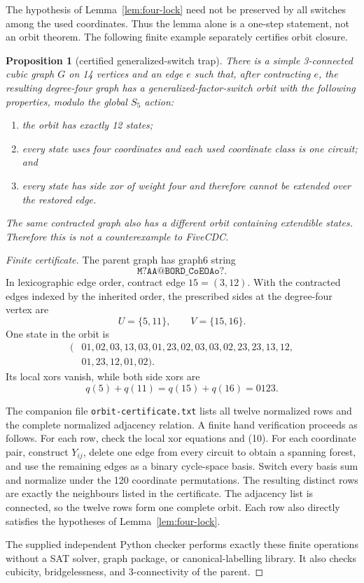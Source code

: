 \documentclass[11pt]{article}
\newtheorem{proposition}[theorem]{Proposition}
\theoremstyle{definition}
\theoremstyle{remark}
\begin{document}
The hypothesis of Lemma~\ref{lem:four-lock} need not be preserved by all
switches among the used coordinates.  Thus the lemma alone is a one-step
statement, not an orbit theorem.  The following finite example separately
certifies orbit closure.

\begin{proposition}[certified generalized-switch trap]\label{prop:trap}
There is a simple 3-connected cubic graph \(G\) on 14 vertices and an edge
\(e\) such that, after contracting \(e\), the resulting degree-four graph
has a generalized-factor-switch orbit with the following properties,
modulo the global \(S_5\) action:
\begin{enumerate}
 \item the orbit has exactly 12 states;
 \item every state uses four coordinates and each used coordinate class
 is one circuit; and
 \item every state has side xor of weight four and therefore cannot be
 extended over the restored edge.
\end{enumerate}
The same contracted graph also has a different orbit containing
extendible states.  Therefore this is not a counterexample to FiveCDC.
\end{proposition}

\begin{proof}[Finite certificate]
The parent graph has graph6 string
\[
 \texttt{M?AA@BORD\_CoEOAo?}.
\]
In lexicographic edge order, contract edge \(15=(3,12)\).  With the
contracted edges indexed by the inherited order, the prescribed sides at
the degree-four vertex are
\[
 U=\{5,11\},\qquad V=\{15,16\}.
\]
One state in the orbit is
\[
\begin{split}
(&01,02,03,13,03,01,23,02,03,03,02,23,23,13,12,\\
 &01,23,12,01,02).
\end{split}                                                  \tag{9}
\]
Its local xors vanish, while both side xors are
\[
 q(5)+q(11)=q(15)+q(16)=0123.                               \tag{10}
\]

The companion file \texttt{orbit-certificate.txt} lists all twelve
normalized rows and the complete normalized adjacency relation.  A
finite hand verification proceeds as follows.  For each row, check the
local xor equations and (10).  For each coordinate pair, construct
\(Y_{ij}\), delete one edge from every circuit to obtain a spanning
forest, and use the remaining edges as a binary cycle-space basis.
Switch every basis sum and normalize under the 120 coordinate
permutations.  The resulting distinct rows are exactly the neighbours
listed in the certificate.  The adjacency list is connected, so the
twelve rows form one complete orbit.  Each row also directly satisfies
the hypotheses of Lemma~\ref{lem:four-lock}.

The supplied independent Python checker performs exactly these finite
operations without a SAT solver, graph package, or canonical-labelling
library.  It also checks cubicity, bridgelessness, and 3-connectivity of
the parent.
\end{proof}
\end{document}
